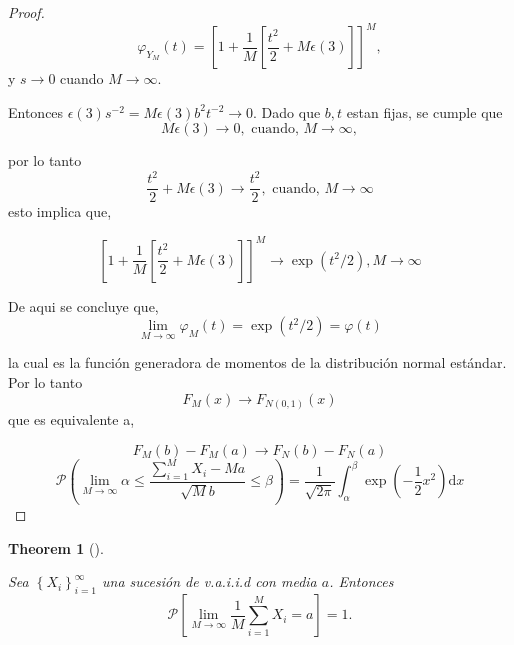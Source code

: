 \documentclass[
  letterpaper,
  DIV=11,
  numbers=noendperiod]{scrreprt}
\theoremstyle{plain}
\newtheorem{theorem}{Theorem}[chapter]
\theoremstyle{definition}
\theoremstyle{remark}
\begin{document}
\begin{proof}
\[
\varphi_{Y_M}\left(t\right)=\left[1+\dfrac{1}{M}\left[\dfrac{t^{2}}{2}+M\epsilon\left(3\right)\right]\right]^{M},
\] y \(s\to0\) cuando \(M\to\infty\).

Entonces
\(\epsilon\left(3\right)s^{-2}=M\epsilon\left(3\right)b^{2}t^{-2}\to0\).
Dado que \(b,t\) estan fijas, se cumple que \[
M\epsilon\left(3\right)\to0,\text{ cuando, }M\to\infty,
\]

por lo tanto \[
\dfrac{t^{2}}{2}+M\epsilon\left(3\right) \to\dfrac{t^{2}}{2},\text{ cuando, }M\to\infty
\] esto implica que,

\[
\left[1+\dfrac{1}{M}\left[\dfrac{t^{2}}{2}+M\epsilon\left(3\right)\right]\right]^{M} \to\exp\left(t^{2}/2\right),M\to\infty
\]

De aqui se concluye que, \[
\lim_{M\to\infty}\varphi_{M}\left(t\right)  =\exp\left(t^{2}/2\right)=\varphi\left(t\right)
\]

la cual es la función generadora de momentos de la distribución normal
estándar. Por lo tanto \[
F_{M}\left(x\right)\to F_{N\left(0,1\right)}\left(x\right)
\] que es equivalente a,

\[
F_{M}\left(b\right)-F_{M}\left(a\right)  \to F_{N}\left(b\right)-F_{N}\left(a\right)
\] \[
\mathcal{P}\left(\lim_{M\to\infty}\alpha\le\dfrac{{\displaystyle \sum_{i=1}^{M}}X_{i}-Ma}{\sqrt{M}b}\leq\beta\right) =\dfrac{1}{\sqrt{2\pi}}\int_{\alpha}^{\beta}\exp\left(-\dfrac{1}{2}x^{2}\right)\mathrm{d}x
\]

\end{proof}

\begin{theorem}[]\protect\hypertarget{thm-5.4}{}\label{thm-5.4}

Sea \(\left\{ X_{i}\right\} _{i=1}^{\infty}\) una sucesión de v.a.i.i.d
con media \(a\). Entonces \[
\mathcal{P}\left[\lim_{M\to\infty}\dfrac{1}{M}\sum_{i=1}^{M}X_{i}=a\right]=1.
\]

\end{theorem}
\end{document}
